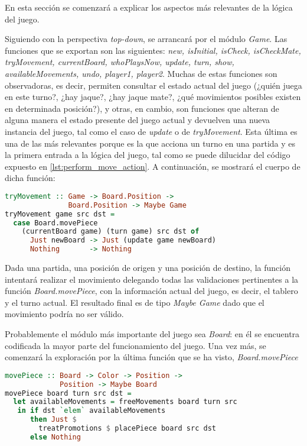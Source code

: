\documentclass{llncs}
\begin{document}
En esta sección se comenzará a explicar los aspectos más relevantes de la lógica del juego.

Siguiendo con la perspectiva \textit{top-down}, se arrancará por el módulo \textit{Game}. Las funciones que se exportan son las siguientes: \textit{new, isInitial, isCheck, isCheckMate, tryMovement, currentBoard, whoPlaysNow, update, turn, show, availableMovements, undo, player1, player2}. Muchas de estas funciones son observadoras, es decir, permiten consultar el estado actual del juego (¿quién juega en este turno?, ¿hay jaque?, ¿hay jaque mate?, ¿qué movimientos posibles existen en determinada posición?), y otras, en cambio, son funciones que alteran de alguna manera el estado presente del juego actual y devuelven una nueva instancia del juego, tal como el caso de \textit{update} o de \textit{tryMovement}. Esta última es una de las más relevantes porque es la que acciona un turno en una partida y es la primera entrada a la lógica del juego, tal como se puede dilucidar del código expuesto en \ref{lst:perform_move_action}. A continuación, se mostrará el cuerpo de dicha función:


\begin{lstlisting}[frame=single, language=haskell, captionpos=b, caption=Función tryMovement, label={lst:try_movement}]
tryMovement :: Game -> Board.Position ->
               Board.Position -> Maybe Game
tryMovement game src dst =
  case Board.movePiece
    (currentBoard game) (turn game) src dst of
      Just newBoard -> Just (update game newBoard)
      Nothing       -> Nothing
\end{lstlisting}

Dada una partida, una posición de origen y una posición de destino, la función intentará realizar el movimiento delegando todas las validaciones pertinentes a la función \textit{Board.movePiece}, con la información actual del juego, es decir, el tablero y el turno actual. El resultado final es de tipo \textit{Maybe Game} dado que el movimiento podría no ser válido.

Probablemente el módulo más importante del juego sea \textit{Board}: en él se encuentra codificada la mayor parte del funcionamiento del juego. Una vez más, se comenzará la exploración por la última función que se ha visto, \textit{Board.movePiece}


\begin{lstlisting}[frame=single, language=haskell, captionpos=b, caption=Función movePiece, label={lst:move_piece}]
movePiece :: Board -> Color -> Position ->
             Position -> Maybe Board
movePiece board turn src dst =
  let availableMovements = freeMovements board turn src
   in if dst `elem` availableMovements
      then Just $
        treatPromotions $ placePiece board src dst
      else Nothing
\end{lstlisting}
\end{document}
